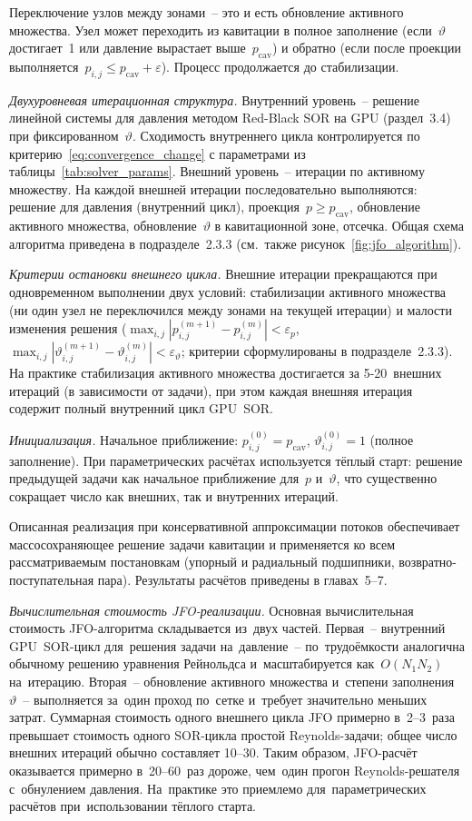 Переключение узлов между зонами~-- это и есть обновление активного множества. Узел может переходить из кавитации в полное заполнение (если~$\vartheta$ достигает~1 или давление вырастает выше~$p_{\mathrm{cav}}$) и обратно (если после проекции выполняется~$p_{i,j} \leq p_{\mathrm{cav}} + \varepsilon$). Процесс продолжается до стабилизации.

\textit{Двухуровневая итерационная структура.}
Внутренний уровень~-- решение линейной системы для давления методом Red-Black SOR на GPU (раздел~3.4) при фиксированном~$\vartheta$. Сходимость внутреннего цикла контролируется по критерию~\eqref{eq:convergence_change} с параметрами из таблицы~\ref{tab:solver_params}. Внешний уровень~-- итерации по активному множеству. На каждой внешней итерации последовательно выполняются: решение для давления (внутренний цикл), проекция~$p \geq p_{\mathrm{cav}}$, обновление активного множества, обновление~$\vartheta$ в кавитационной зоне, отсечка. Общая схема алгоритма приведена в подразделе~2.3.3 (см.\ также рисунок~\ref{fig:jfo_algorithm}).

\textit{Критерии остановки внешнего цикла.}
Внешние итерации прекращаются при одновременном выполнении двух условий: стабилизации активного множества (ни один узел не переключился между зонами на текущей итерации) и малости изменения решения ($\max_{i,j} |p_{i,j}^{(m+1)} - p_{i,j}^{(m)}| < \varepsilon_p$, $\max_{i,j} |\vartheta_{i,j}^{(m+1)} - \vartheta_{i,j}^{(m)}| < \varepsilon_\vartheta$; критерии сформулированы в подразделе~2.3.3). На практике стабилизация активного множества достигается за 5-20~внешних итераций (в зависимости от задачи), при этом каждая внешняя итерация содержит полный внутренний цикл GPU~SOR.

\textit{Инициализация.}
Начальное приближение: $p^{(0)}_{i,j} = p_{\mathrm{cav}}$, $\vartheta^{(0)}_{i,j} = 1$ (полное заполнение). При параметрических расчётах используется тёплый старт: решение предыдущей задачи как начальное приближение для~$p$ и~$\vartheta$, что существенно сокращает число как внешних, так и внутренних итераций.

Описанная реализация при консервативной аппроксимации потоков обеспечивает массосохраняющее решение задачи кавитации и применяется ко всем рассматриваемым постановкам (упорный и радиальный подшипники, возвратно-поступательная пара). Результаты расчётов приведены в главах~5--7.

\textit{Вычислительная стоимость JFO-реализации.}
Основная вычислительная стоимость JFO-алгоритма складывается из~двух частей. Первая~-- внутренний GPU~SOR-цикл для~решения задачи на~давление~-- по~трудоёмкости аналогична обычному решению уравнения Рейнольдса и~масштабируется как~$O(N_1 N_2)$ на~итерацию. Вторая~-- обновление активного множества и~степени заполнения~$\vartheta$~-- выполняется за~один проход по~сетке и~требует значительно меньших затрат. Суммарная стоимость одного внешнего цикла JFO примерно в~2--3~раза превышает стоимость одного SOR-цикла простой Reynolds-задачи; общее число внешних итераций обычно составляет 10--30. Таким образом, JFO-расчёт оказывается примерно в~20--60~раз дороже, чем~один прогон Reynolds-решателя с~обнулением давления. На~практике это приемлемо для~параметрических расчётов при~использовании тёплого старта.

